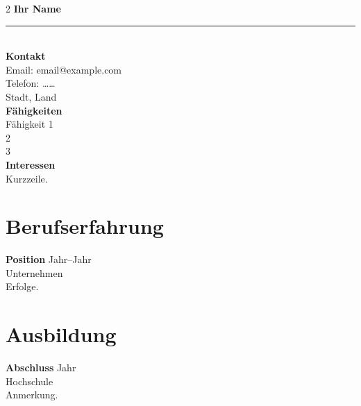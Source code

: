 \documentclass[11pt,a4paper]{article}
\begin{document}
\begin{paracol}{2}
\setlength{\parindent}{0pt}
{\large \textbf{Ihr Name}}\\[0.2em]
\rule{\linewidth}{2.2cm}\\[0.5em]
\textbf{Kontakt}\\
Email: email@example.com\\
Telefon: ……\\
Stadt, Land\\[0.6em]
\textbf{Fähigkeiten}\\
Fähigkeit 1\\ 2\\ 3\\[0.6em]
\textbf{Interessen}\\
Kurzzeile.

\switchcolumn
\section*{Berufserfahrung}
\textbf{Position} \hfill Jahr--Jahr \\
Unternehmen \\
Erfolge.

\section*{Ausbildung}
\textbf{Abschluss} \hfill Jahr \\
Hochschule \\
Anmerkung.
\end{paracol}
\end{document}

